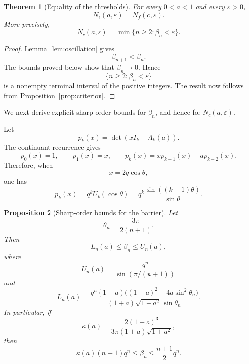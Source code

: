 \documentclass[11pt]{article}
\newtheorem{theorem}{Theorem}
\newtheorem{proposition}[theorem]{Proposition}
\begin{document}
\begin{theorem}[Equality of the thresholds]\label{thm:threshold}
For every \(0<a<1\) and every \(\varepsilon>0\),
\[
N_e(a,\varepsilon)=N_f(a,\varepsilon).
\]
More precisely,
\[
N_c(a,\varepsilon)
=
\min\{n\ge2:\beta_n<\varepsilon\}.
\]
\end{theorem}

\begin{proof}
Lemma~\ref{lem:oscillation} gives
\[
\beta_{n+1}<\beta_n.
\]
The bounds proved below show that \(\beta_n\to0\). Hence
\[
\{n\ge2:\beta_n<\varepsilon\}
\]
is a nonempty terminal interval of the positive integers. The result
now follows from Proposition~\ref{prop:criterion}.
\end{proof}

We next derive explicit sharp-order bounds for \(\beta_n\), and hence
for \(N_c(a,\varepsilon)\).

Let
\[
p_k(x)=\det(xI_k-A_k(a)).
\]
The continuant recurrence gives
\[
p_0(x)=1,\qquad
p_1(x)=x,\qquad
p_k(x)=xp_{k-1}(x)-ap_{k-2}(x).
\]
Therefore, when
\[
x=2q\cos\theta,
\]
one has
\[
p_k(x)
=
q^kU_k(\cos\theta)
=
q^k\frac{\sin((k+1)\theta)}{\sin\theta}.
\]

\begin{proposition}[Sharp-order bounds for the barrier]\label{prop:barrier-bounds}
Let
\[
\theta_n=\frac{3\pi}{2(n+1)}.
\]
Then
\[
L_n(a)\le\beta_n\le U_n(a),
\]
where
\[
U_n(a)
=
\frac{q^n}{\sin(\pi/(n+1))}
\]
and
\[
L_n(a)
=
\frac{
q^n(1-a)
\bigl((1-a)^2+4a\sin^2\theta_n\bigr)
}{
(1+a)\sqrt{1+a^2}\,\sin\theta_n
}.
\]
In particular, if
\[
\kappa(a)
=
\frac{2(1-a)^3}
{3\pi(1+a)\sqrt{1+a^2}},
\]
then
\[
\kappa(a)(n+1)q^n
\le
\beta_n
\le
\frac{n+1}{2}q^n.
\]
\end{proposition}
\end{document}
